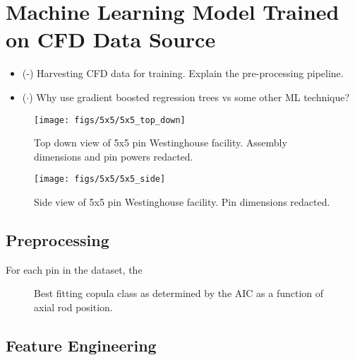 
\section{Machine Learning Model Trained on CFD Data Source}

\begin{itemize}
	\item (\checkmark-) Harvesting CFD data for training. Explain the pre-processing pipeline.
	\item ($\cdot$) Why use gradient boosted regression trees vs some other ML technique?
\end{itemize}

\begin{figure}[H]
    \centering
    \texttt{[image: figs/5x5/5x5\_top\_down]}
    \caption[Top down view of 5x5 pin Westinghouse facility.]{Top down view of 5x5 pin Westinghouse facility.  Assembly dimensions and pin powers redacted.}
    \label{fig:5x5topdown}
\end{figure}

\begin{figure}[H]
    \centering
    \texttt{[image: figs/5x5/5x5\_side]}
    \caption[Side view of 5x5 pin Westinghouse facility.]{Side view of 5x5 pin Westinghouse facility.  Pin dimensions redacted.}
    \label{fig:5x5side}
\end{figure}


\subsection{Preprocessing}
For each pin in the dataset, the 
\begin{figure}[H]%
    \centering
    \qquad
    \qquad
    \qquad
    \qquad
    \caption[Best fitting copula to CFD data.]{Best fitting copula class as determined by the AIC as a function of axial rod position.}%
    \label{fig:copula_predicted}%
\end{figure}


\subsection{Feature Engineering}

